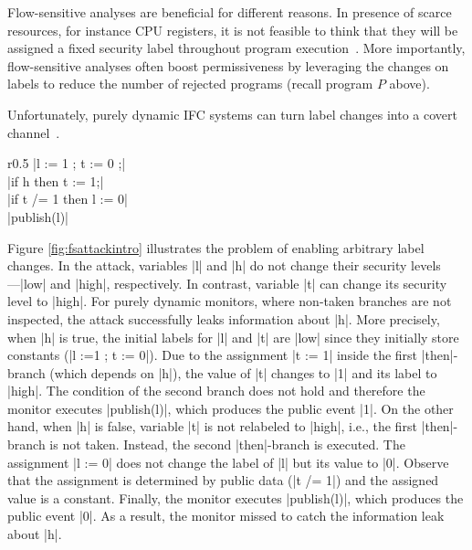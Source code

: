 
Flow-sensitive analyses are beneficial for different reasons. In presence of
scarce resources, for instance CPU registers, it is not feasible to think that
they will be assigned a fixed security label throughout program
execution~\citep{BonelliCM05}. More importantly, flow-sensitive analyses often
boost permissiveness by leveraging the changes on labels to reduce the number of
rejected programs (recall program $P$ above). 


Unfortunately, purely dynamic IFC
systems can turn label changes into a covert channel~\citep{Russo:2010}. 
\begin{wrapfigure}{r}{0.5\columnwidth}
|l := 1 ; t := 0 ;| \\
|if h then t := 1;| \\
|if t /= 1 then l := 0| \\
|publish(l)| 
\caption{\small\label{fig:fsattackintro} Flow-sensitive attack}
\end{wrapfigure}
Figure \ref{fig:fsattackintro} illustrates the problem of enabling arbitrary
label changes.  In the attack, variables |l| and |h| do not change their
security levels---|low| and |high|, respectively. In contrast, variable |t| can
change its security level to |high|. For purely dynamic monitors, where
non-taken branches are not inspected, the attack successfully leaks information
about |h|. More precisely, when |h| is true, the initial labels for |l| and |t|
are |low| since they initially store constants (|l :=1 ; t := 0|).  Due to 
the assignment |t := 1| inside the
first |then|-branch (which depends on |h|), the value of |t| changes to |1| and its label to
|high|. The condition of the second branch does not hold and therefore 
the monitor executes |publish(l)|, which produces the public event 
|1|. On the other hand, when |h| is false, variable |t| is not relabeled to 
|high|, i.e., the first |then|-branch is not taken. Instead, the second
|then|-branch is executed. 
The assignment |l := 0| does not change the label of |l| but its value to 
 |0|. Observe that the assignment is determined by public data (|t /= 1|)
and the assigned value is a constant. Finally, the monitor executes
|publish(l)|, which produces the public event |0|. As a result, the monitor 
missed to catch the information leak about |h|.  

